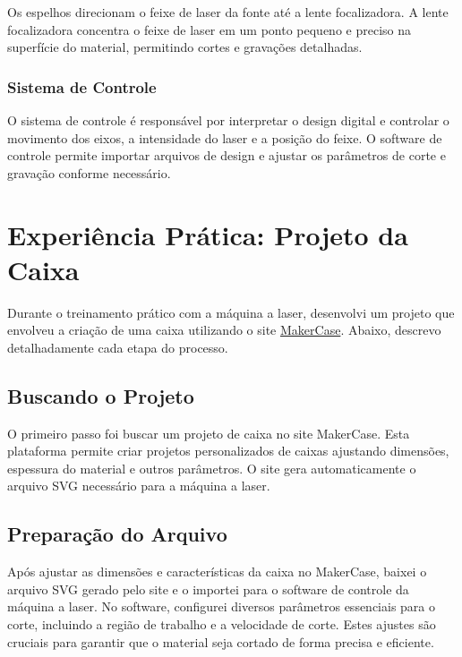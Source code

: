 \documentclass[
]{book}
\begin{document}
Os espelhos direcionam o feixe de laser da fonte até a lente focalizadora. A lente focalizadora concentra o feixe de laser em um ponto pequeno e preciso na superfície do material, permitindo cortes e gravações detalhadas.

\subsubsection{Sistema de Controle}\label{sistema-de-controle}

O sistema de controle é responsável por interpretar o design digital e controlar o movimento dos eixos, a intensidade do laser e a posição do feixe. O software de controle permite importar arquivos de design e ajustar os parâmetros de corte e gravação conforme necessário.

\section{Experiência Prática: Projeto da Caixa}\label{experiuxeancia-pruxe1tica-projeto-da-caixa}

Durante o treinamento prático com a máquina a laser, desenvolvi um projeto que envolveu a criação de uma caixa utilizando o site \href{https://pt.makercase.com/\#/}{MakerCase}. Abaixo, descrevo detalhadamente cada etapa do processo.

\subsection{Buscando o Projeto}\label{buscando-o-projeto-1}

O primeiro passo foi buscar um projeto de caixa no site MakerCase. Esta plataforma permite criar projetos personalizados de caixas ajustando dimensões, espessura do material e outros parâmetros. O site gera automaticamente o arquivo SVG necessário para a máquina a laser.

\subsection{Preparação do Arquivo}\label{preparauxe7uxe3o-do-arquivo-1}

Após ajustar as dimensões e características da caixa no MakerCase, baixei o arquivo SVG gerado pelo site e o importei para o software de controle da máquina a laser. No software, configurei diversos parâmetros essenciais para o corte, incluindo a região de trabalho e a velocidade de corte. Estes ajustes são cruciais para garantir que o material seja cortado de forma precisa e eficiente.
\end{document}
